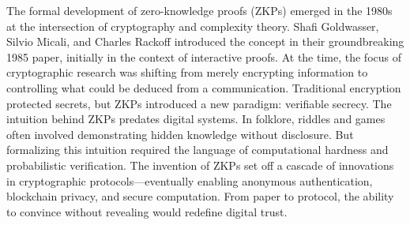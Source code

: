 
\begin{historical}
The formal development of zero-knowledge proofs (ZKPs) emerged in the 1980s at the intersection of cryptography and complexity theory. Shafi Goldwasser, Silvio Micali, and Charles Rackoff introduced the concept in their groundbreaking 1985 paper, initially in the context of interactive proofs. At the time, the focus of cryptographic research was shifting from merely encrypting information to controlling what could be deduced from a communication. Traditional encryption protected secrets, but ZKPs introduced a new paradigm: verifiable secrecy.
The intuition behind ZKPs predates digital systems. In folklore, riddles and games often involved demonstrating hidden knowledge without disclosure. But formalizing this intuition required the language of computational hardness and probabilistic verification. The invention of ZKPs set off a cascade of innovations in cryptographic protocols—eventually enabling anonymous authentication, blockchain privacy, and secure computation. From paper to protocol, the ability to convince without revealing would redefine digital trust.
\end{historical}